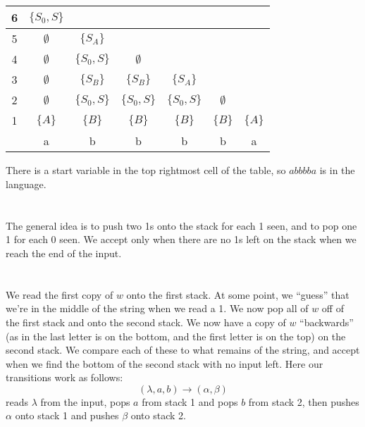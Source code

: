 \documentclass{article}
\begin{document}
\subsection{} %
\begin{tabular}{|c|c|c|c|c|c|c|}
	\hline
	6 & $\{S_0,S\}$ &  &  &  &  & \\
	\hline
	5 & $\emptyset$ & $\{S_A\}$ &  &  &  & \\
	\hline
	4 & $\emptyset$ & $\{S_0,S\}$ & $\emptyset$ &  &  & \\
	\hline
	3 & $\emptyset$ & $\{S_B\}$ & $\{S_B\}$ & $\{S_A\}$ &  & \\
	\hline
	2 & $\emptyset$ & $\{S_0,S\}$ & $\{S_0,S\}$ & $\{S_0,S\}$ & $\emptyset$ & \\
	\hline
	1 & $\{A\}$ & $\{B\}$ & $\{B\}$ & $\{B\}$ & $\{B\}$ & $\{A\}$ \\
	\hline
	& a & b & b & b & b & a \\
	\hline
\end{tabular}
\newline
\newline
There is a start variable in the top rightmost cell of the table, so $abbbba$
is in the language.
\section{} %
The general idea is to push two 1s onto the stack for each 1 seen, and to pop
one 1 for each 0 seen. We accept only when there are no 1s left on the stack
when we reach the end of the input.
\newline
\begin{minipage}{\textwidth}

\end{minipage}
\section{} %
We read the first copy of $w$ onto the first stack. At some point, we ``guess''
that we're in the middle of the string when we read a 1. We now pop all of $w$
off of the first stack and onto the second stack. We now have a copy of $w$
``backwards'' (as in the last letter is on the bottom, and the first letter is
on the top) on the second stack. We compare each of these to what remains of
the string, and accept when we find the bottom of the second stack with no
input left.
\newline
\newline
Here our transitions work as follows:
\[(\lambda,a,b)\rightarrow(\alpha,\beta)\]
reads $\lambda$ from the input, pops $a$ from stack 1 and pops $b$ from stack 2,
then pushes $\alpha$ onto stack 1 and pushes $\beta$ onto stack 2.
\newline
\newline
\begin{minipage}{\textwidth}

\end{minipage}
\end{document}
